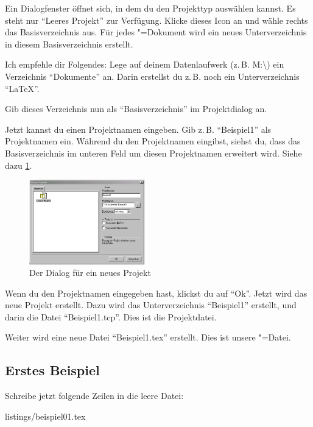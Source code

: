 Ein Dialogfenster öffnet sich, in dem du den Projekttyp auswählen kannst. Es steht nur \enquote{Leeres Projekt} zur Verfügung. Klicke dieses Icon an und wähle rechts das Basisverzeichnis aus. Für jedes \DMLLaTeX"=Dokument wird ein neues Unterverzeichnis in diesem Basisverzeichnis erstellt.

Ich empfehle dir Folgendes: Lege auf deinem Datenlaufwerk (z.\,B. M:\textbackslash ) ein Verzeichnis \enquote{Dokumente} an. Darin erstellst du z.\,B. noch ein Unterverzeichnis \enquote{LaTeX}.

Gib dieses Verzeichnis nun als \enquote{Basisverzeichnis} im Projektdialog an.

Jetzt kannst du einen Projektnamen eingeben. Gib z.\,B. \enquote{Beispiel1} als Projektnamen ein. Während du den Projektnamen eingibst, siehst du, dass das Basisverzeichnis im unteren Feld um diesen Projektnamen erweitert wird. Siehe dazu \cref{fig:beispiel1_02}.

\begin{figure}[ht]
	\begin{center}
		\includegraphics[width=5cm]{images/beispiel1_02.png}
	\end{center}
	\caption{Der Dialog für ein neues Projekt}
	\label{fig:beispiel1_02}
\end{figure}

Wenn du den Projektnamen eingegeben hast, klickst du auf \enquote{Ok}. Jetzt wird das neue Projekt erstellt. Dazu wird das Unterverzeichnis \enquote{Beispiel1} erstellt, und darin die Datei \enquote{Beispiel1.tcp}. Dies ist die Projektdatei.

Weiter wird eine neue Datei \enquote{Beispiel1.tex} erstellt. Dies ist unsere \DMLLaTeX"=Datei.

\subsection{Erstes Beispiel}
\label{sec:erstesbeispiel}

Schreibe jetzt folgende Zeilen in die leere Datei:

%
	{listings/beispiel01.tex}

